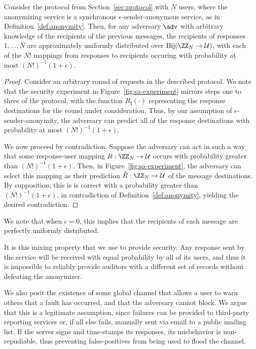 \documentclass[USenglish]{llncs}
\begin{document}
\begin{theorem}\label{thm:response-distribution}
Consider the protocol from Section~\ref{sec:protocol} with $N$ users, where the anonymizing service
is a synchronous $\epsilon$-sender-anonymous service, as in Definition~\ref{def:anonymity}.
Then, for any adversary $\adv$ with arbitrary knowledge of the recipients of the previous
messages, the recipients of responses $1, \ldots, N$ are approximately
uniformly distributed over $\mathrm{Bij}(\ZZ_N \rightarrow \mathcal{U})$,
with each of the $N!$ mappings from responses to recipients occuring with probability at most
$(N!)^{-1}(1 + \epsilon)$.

\begin{proof}
Consider an arbitrary round of requests in the described protocol.
We note that the security experiment in Figure~\ref{fig:sa-experiment} mirrors steps
one to three of the protocol, with the function $R_\mathrm{I}(\cdot)$
representing the response destinations for the round under consideration.  Thus, by
our assumption of $\epsilon$-sender-anonymity, the adversary can predict all of the
response destinations with probability at most $(N!)^{-1}(1 + \epsilon)$. 

We now proceed by contradiction.  Suppose the adversary can act in such a way that
some response-user mapping $R: \ZZ_N \rightarrow \mathcal{U}$ occurs with
probability greater than $(N!)^{-1}(1 + \epsilon)$.  Then, in
Figure~\ref{fig:sa-experiment}, the adversary can select this mapping as their
prediction $\hat{R} : \ZZ_N \rightarrow \mathcal{U}$ of the message destinations.
By supposition, this is is correct with a probability greater than $(N!)^{-1}(1 + \epsilon)$,
in contradiction of Definition~\ref{def:anonymity}, yielding the desired contradiction.
\end{proof}
\end{theorem}

We note that when $\epsilon = 0$, this implies that the recipients of each
message are perfectly uniformly distributed.

It is this mixing property that we use to provide security.  Any response
sent by the service will be received with equal probability by all of its users,
and thus it is impossible to reliably provide auditors with a different set of
records without defeating the anonymizer.

We also posit the existence of some global channel that allows
a user to warn others that a fault has occurred, and that the adversary
cannot block.  We argue that this is a
legitimate assumption, since failures can be provided to third-party reporting
services or, if all else fails, manually sent via email to a public mailing list.  If
the server signs and time-stamps its responses, its misbehavior is non-repudiable,
thus preventing false-positives from being used to flood the channel.
\end{document}

